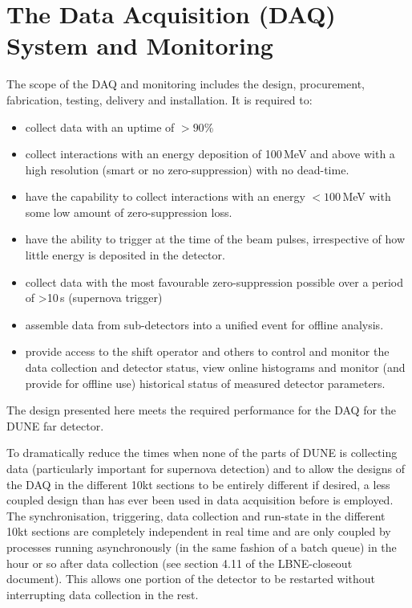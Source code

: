 \section{The Data Acquisition (DAQ) System and Monitoring} 
\label{sec:detectors-fd-ref-daq}

The scope of the DAQ and monitoring includes the design, procurement,
fabrication, testing, delivery and installation. It is required to:
\begin{itemize}
\item collect data with an uptime of $>90$\%
\item collect interactions with an energy deposition of
  100\,MeV and above with a high resolution (smart or no
  zero-suppression) with no dead-time.
\item have the capability to collect interactions with an energy $<100$\,MeV with some
 low amount of zero-suppression loss.
\item have the ability to trigger at the time of the beam pulses,
  irrespective of how little energy is deposited in the detector.
\item collect data with the most favourable zero-suppression possible over a
  period of >10\,s (supernova trigger)
\item assemble data from sub-detectors into a unified
  event for offline analysis.
\item provide access to the shift operator and others to control and
  monitor the data collection and detector status, view online
  histograms and monitor (and provide for offline use) historical
  status of measured detector parameters. 
\end{itemize}
The design presented here meets the required performance for the DAQ
for the DUNE far detector.

To dramatically reduce the times when none of the parts of DUNE is
collecting data (particularly important for supernova detection) and
to allow the designs of the DAQ in the different 10kt sections to be
entirely different if desired, a less coupled design than has ever
been used in data acquisition before is employed.  The
synchronisation, triggering, data collection and run-state in the
different 10kt sections are completely independent in real time and
are only coupled by processes running asynchronously (in the same fashion
of a batch queue) in the hour or so after data collection (see section
4.11 of the LBNE-closeout document).  This allows one portion of the
detector to be restarted without interrupting data collection in the
rest.

